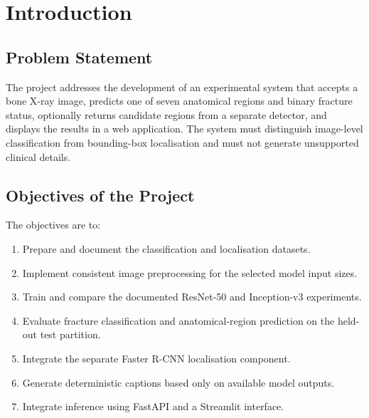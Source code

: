 \documentclass{article}
\begin{document}
\newpage

\tableofcontents
\newpage
\listoffigures
\newpage
\listoftables
\newpage

\renewcommand{\thepage}{\arabic{page}}
\setcounter{page}{1}

\section{Introduction}

\subsection{Problem Statement}
The project addresses the development of an experimental system that accepts a bone X-ray image, predicts one of seven anatomical regions and binary fracture status, optionally returns candidate regions from a separate detector, and displays the results in a web application. The system must distinguish image-level classification from bounding-box localisation and must not generate unsupported clinical details.

\subsection{Objectives of the Project}
The objectives are to:
\begin{enumerate}[noitemsep]
    \item Prepare and document the classification and localisation datasets.
    \item Implement consistent image preprocessing for the selected model input sizes.
    \item Train and compare the documented ResNet-50 and Inception-v3 experiments.
    \item Evaluate fracture classification and anatomical-region prediction on the held-out test partition.
    \item Integrate the separate Faster R-CNN localisation component.
    \item Generate deterministic captions based only on available model outputs.
    \item Integrate inference using FastAPI and a Streamlit interface.
\end{enumerate}
\end{document}

